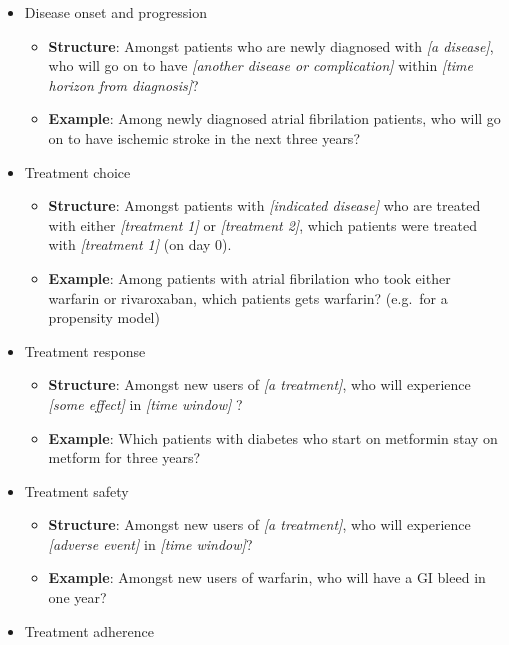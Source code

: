 \documentclass[11pt]{book}
\providecommand{\tightlist}{%
  \setlength{\itemsep}{0pt}\setlength{\parskip}{0pt}}
\begin{document}
\begin{itemize}
\tightlist
\item
  Disease onset and progression

  \begin{itemize}
  \tightlist
  \item
    \textbf{Structure}: Amongst patients who are newly diagnosed with
    \emph{{[}a disease{]}}, who will go on to have \emph{{[}another
    disease or complication{]}} within \emph{{[}time horizon from
    diagnosis{]}}?
  \item
    \textbf{Example}: Among newly diagnosed atrial fibrilation patients,
    who will go on to have ischemic stroke in the next three years?
  \end{itemize}
\item
  Treatment choice

  \begin{itemize}
  \tightlist
  \item
    \textbf{Structure}: Amongst patients with \emph{{[}indicated
    disease{]}} who are treated with either \emph{{[}treatment 1{]}} or
    \emph{{[}treatment 2{]}}, which patients were treated with
    \emph{{[}treatment 1{]}} (on day 0).
  \item
    \textbf{Example}: Among patients with atrial fibrilation who took
    either warfarin or rivaroxaban, which patients gets warfarin?
    (e.g.~for a propensity model)
  \end{itemize}
\item
  Treatment response

  \begin{itemize}
  \tightlist
  \item
    \textbf{Structure}: Amongst new users of \emph{{[}a treatment{]}},
    who will experience \emph{{[}some effect{]}} in \emph{{[}time
    window{]}} ?
  \item
    \textbf{Example}: Which patients with diabetes who start on
    metformin stay on metform for three years?
  \end{itemize}
\item
  Treatment safety

  \begin{itemize}
  \tightlist
  \item
    \textbf{Structure}: Amongst new users of \emph{{[}a treatment{]}},
    who will experience \emph{{[}adverse event{]}} in \emph{{[}time
    window{]}}?
  \item
    \textbf{Example}: Amongst new users of warfarin, who will have a GI
    bleed in one year?
  \end{itemize}
\item
  Treatment adherence


\end{itemize}
\end{document}
